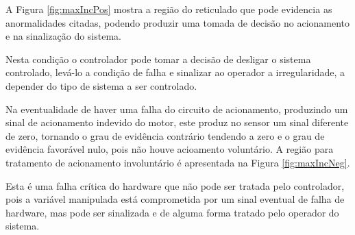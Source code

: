 A Figura \ref{fig:maxIncPos} mostra a região do reticulado que pode
evidencia as anormalidades citadas,
podendo produzir uma tomada de decisão no acionamento e na sinalização do sistema.


Nesta condição o controlador pode tomar a decisão de 
desligar o sistema controlado, 
levá-lo a condição de falha e 
sinalizar ao operador a irregularidade, 
a depender do tipo de sistema a ser controlado.




Na eventualidade de haver uma falha do circuito de acionamento,
produzindo um sinal de acionamento indevido do motor,
este produz no sensor um sinal diferente de zero,
tornando o grau de evidência contrário tendendo a zero e
o grau de evidência favorável nulo,
pois não houve acioamento voluntário.
A região para tratamento de acionamento involuntário
é apresentada na Figura \ref{fig:maxIncNeg}.

Esta é uma falha crítica do hardware que não pode ser tratada pelo controlador,
pois a variável manipulada está comprometida por
um sinal eventual de falha de hardware,
mas pode ser sinalizada e de alguma forma tratado pelo operador do sistema.







